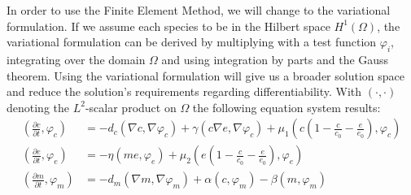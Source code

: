 In order to use the Finite Element Method, we will change to the variational formulation. If we assume each species to be in the Hilbert space $H^1(\Omega)$, the variational formulation can be derived by multiplying with a test function $\varphi_i$, integrating over the domain $\Omega$ and using integration by parts and the Gauss theorem. Using the variational formulation will give us a broader solution space and reduce the solution's requirements regarding differentiability. With $\left(\cdot, \cdot\right)$ denoting the $L^2$-scalar product on $\Omega$ the following equation system results:
\begin{align}
    \left(\frac{\partial c}{\partial t}, \varphi_c\right) &=
        - d_c\left(\nabla c, \nabla \varphi_c\right) + \gamma \left(c\nabla e, \nabla \varphi_c\right) + \mu_1 \left(c \left(1-\frac{c}{c_0} - \frac{e}{e_0}\right), \varphi_c\right) \label{eq:11}\\
    \left(\frac{\partial e}{\partial t}, \varphi_e\right) &=  -\eta \left( me, \varphi_e\right) + \mu_2 \left(e\left(1-\frac{c}{c_0}-\frac{e}{e_0}\right),\varphi_e\right) \label{eq:12}\\
    \left(\frac{\partial m}{\partial t}, \varphi_m\right) &= -d_m \left(\nabla m,\nabla \varphi_m\right) + \alpha \left(c,\varphi_m\right) - \beta \left(m,\varphi_m\right) \label{eq:13}
\end{align}
